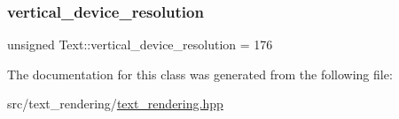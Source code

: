 \subsubsection{\texorpdfstring{vertical\+\_\+device\+\_\+resolution}{vertical\_device\_resolution}}
{\footnotesize\ttfamily unsigned Text\+::vertical\+\_\+device\+\_\+resolution = 176\hspace{0.3cm}{\ttfamily [private]}}



The documentation for this class was generated from the following file\+:\begin{DoxyCompactItemize}
\item 
src/text\+\_\+rendering/\mbox{\hyperlink{text__rendering_8hpp}{text\+\_\+rendering.\+hpp}}\end{DoxyCompactItemize}
